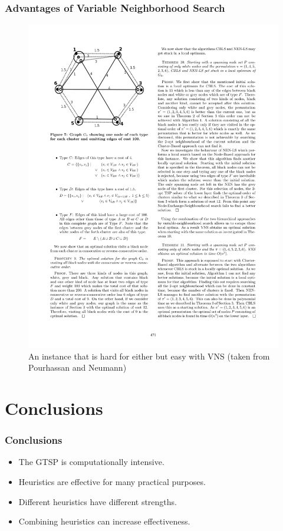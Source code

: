 \documentclass{beamer}
\begin{document}
\begin{frame}
\frametitle{Advantages of Variable Neighborhood Search}
\begin{figure}
	\centering
	\includegraphics[scale=0.8]{GTSPCase3.pdf}
	\caption{An instance that is hard for either but easy with VNS (taken from Pourhassan and Neumann)}
\end{figure}
\end{frame}

\section[Conclusions]{Conclusions}

\begin{frame}
	\frametitle{Conclusions}
	\begin{itemize}
	\item The GTSP is computationally intensive.
	\item Heuristics are effective for many practical purposes.
	\item Different heuristics have different strengths.
	\item Combining heuristics can increase effectiveness.
	\end{itemize}	
\end{frame}
\end{document}
